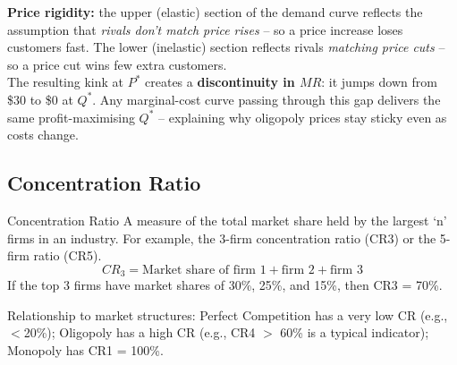 \documentclass[11pt, a4paper, twoside]{book}
\begin{document}
\begin{diagrambox}
{%
}{%
\textbf{\color{CurveNavy}Price rigidity:} the upper (elastic) section of the demand curve reflects the assumption that \textit{rivals don't match price rises} -- so a price increase loses customers fast.  The lower (inelastic) section reflects rivals \textit{matching price cuts} -- so a price cut wins few extra customers.\\[5pt]
The resulting kink at $P^*$ creates a \textbf{discontinuity in $MR$}: it jumps down from \$30 to \$0 at $Q^*$.  Any marginal-cost curve passing through this gap delivers the same profit-maximising $Q^*$ -- explaining why oligopoly prices stay sticky even as costs change.%
}
\end{diagrambox}

\subsection{Concentration Ratio}

\begin{keyterm}{Concentration Ratio}
A measure of the total market share held by the largest `n' firms in an industry. For example, the 3-firm concentration ratio (CR3) or the 5-firm ratio (CR5).
\[ CR_3 = \text{Market share of firm 1} + \text{firm 2} + \text{firm 3} \]
If the top 3 firms have market shares of 30\%, 25\%, and 15\%, then CR3 = 70\%.
\end{keyterm}

Relationship to market structures: Perfect Competition has a very low CR (e.g., $<$20\%); Oligopoly has a high CR (e.g., CR4 $>$ 60\% is a typical indicator); Monopoly has CR1 = 100\%.
\end{document}
